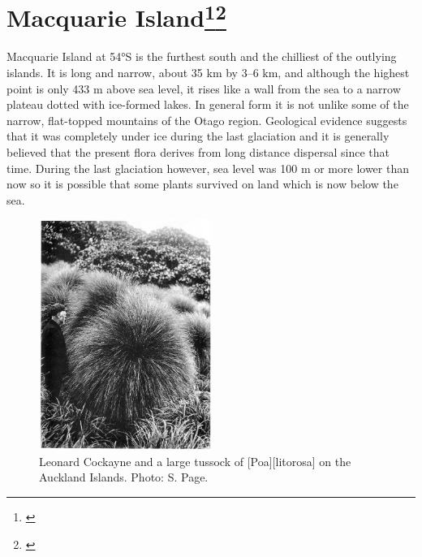 \section[Macquarie Island]{Macquarie Island\footnote{\cite{taylor1955flora}}\footnote{\cite{seppelt1984vascular}}}

Macquarie Island at 54°S is the furthest south and the chilliest of the outlying islands.
It is long and narrow, about 35 km by 3--6 km, and although the highest point is only 433 m above sea level, it rises like a wall from the sea to a narrow plateau dotted with ice-formed lakes.
In general form it is not unlike some of the narrow, flat-topped mountains of the Otago region.
Geological evidence suggests that it was completely under ice during the last glaciation and it is generally believed that the present flora derives from long distance dispersal since that time.
During the last glaciation however, sea level was 100 m or more lower than now so it is possible that some plants survived on land which is now below the sea.

\begin{figure}
	\includegraphics[width=0.5\textwidth]{graphics/figure115cockayne.jpg}
	\centering
	\caption[Leonard Cockayne and a large tussock]{Leonard Cockayne and a large tussock of [Poa][litorosa] on the Auckland Islands.
	Photo: S. Page.}%
	\label{fig:115cockayne}
\end{figure}

